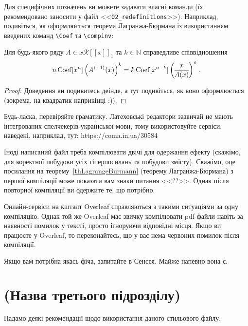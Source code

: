 Для специфічних позначень ви можете задавати власні команди (їх 
рекомендовано заносити у файл <<\verb|02_redefinitions|>>). Наприклад, 
подивіться, як оформлюється теорема Лагранжа-Бюрмана із використанням 
введених команд \verb|\Coef| та \verb|\compinv|:

\begin{theorem} \label{thLagrangeBurmann}
Для будь-якого ряду $A \in x \mathcal R[[x]]_1$ та $k \in \mathbb N$ справедливе співвідношення
$$n \operatorname{Coef}[x^n] \left( A^{\left\langle -1 \right\rangle}(x) \right)^k = k \operatorname{Coef}[x^{n-k}] \left(\! \frac{x}{A(x)} \!\right)^n.$$
\end{theorem}
\begin{proof}
Доведення ви подивитесь деінде, а тут подивіться, як воно оформлюється 
(зокрема, на квадратик наприкінці :)).                                                                                       
\end{proof}

\begin{corollary} \par %
Будь-ласка, перевіряйте граматику. Латеховські редактори зазвичай не мають 
інтегрованих спелчекерів української мови, тому використовуйте сервіси, 
наведені, наприклад, тут: https://coma.in.ua/30584
\end{corollary}

Іноді написаний файл треба компілювати двічі для одержання ефекту 
(скажімо, для коректної побудови усіх гіперпосилань та побудови змісту). 
Скажімо, оце посилання на теорему~\ref{thLagrangeBurmann} (теорему 
Лагранжа-Бюрмана) з першої компіляції може показати вам знаки питання 
<<??>>. Однак після повторної компіляції ви одержите те, що потрібно.

Онлайн-сервіси на кшталт Overleaf справляються з такими ситуаціями за одну компіляцію. Однак той 
же Overleaf має звичку компілювати pdf-файли навіть за наявності помилок у 
тексті, просто ігноруючи відповідні місця. Якщо ви працюєте у Overleaf, 
то переконайтесь, що у вас нема червоних помилок після компіляції.

Якщо вам потрібна якась фіча, запитайте в Сенсея. Майже напевно вона є.


\section{(Назва третього підрозділу)}


Надамо деякі рекомендації щодо використання даного стильового файлу.

